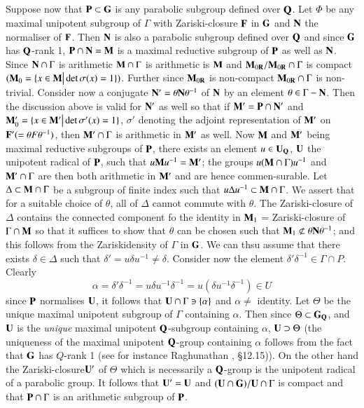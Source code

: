 \subsection{}\label{art9-subsec3.42}
Suppose now that $\mathbf{P} \subset \mathbf{G}$ is any parabolic subgroup defined over $\mathbf{Q}$. Let $\Phi$ be any maximal unipotent subgroup of $\Gamma$ with Zariski-closure $\mathbf{F}$ in $\mathbf{G}$ and $\mathbf{N}$ the normaliser of $\mathbf{F}$. Then $\mathbf{N}$ is also a parabolic subgroup defined over $\mathbf{Q}$ and since $\mathbf{G}$ has $\mathbf{Q}$-rank 1, $\mathbf{P} \cap\mathbf{N} = \mathbf{M}$ is a maximal reductive subgroup of $\mathbf{P}$ as well as $\mathbf{N}$. Since $\mathbf{N} \cap \Gamma$ is arithmetic $\mathbf{M} \cap \Gamma$ is arithmetic is $\mathbf{M}$ and $\mathbf{M}_{0\mathbf{R}}/ \mathbf{M}_{0\mathbf{R}} \cap \Gamma$ is compact $(\mathbf{M}_0 =\{x \in \mathbf{M} \big| \det \sigma (x) =1\})$. Further since $\mathbf{M}_{0\mathbf{R}}$ is non-compact $\mathbf{M}_{0\mathbf{R}} \cap \Gamma$ is non-trivial. Consider now a conjugate $\mathbf{N}' = \theta \mathbf{N} \theta^{-1}$ of $\mathbf{N}$ by an element $\theta \in \Gamma - \mathbf{N}$. Then the discussion above is valid for $\mathbf{N}'$ as well so that if $\mathbf{M}' = \mathbf{P} \cap \mathbf{N}'$ and $\mathbf{M}'_0 = \{x \in \mathbf{M}' \big| \det \sigma' (x) =1\}$, $\sigma'$ denoting the adjoint representation of $\mathbf{M}'$ on $\mathbf{F}' (= \theta F \theta^{-1})$, then $\mathbf{M}' \cap \Gamma$ is arithmetic in $\mathbf{M}'$ as well. Now $\mathbf{M}$ and $\mathbf{M}'$ being maximal reductive subgroups of $\mathbf{P}$, there exists an element $u \in \mathbf{U}_{\mathbf{Q}}$, $\mathbf{U}$ the unipotent radical of $\mathbf{P}$, such that $u \mathbf{M} u^{-1}= \mathbf{M}'$; the groups $u (\mathbf{M} \cap \Gamma) u^{-1}$ and $\mathbf{M}' \cap \Gamma$ are then both arithmetic in $\mathbf{M}'$ and are hence commen-surable. Let $\Delta \subset \mathbf{M} \cap \Gamma$ be a subgroup of finite index such that $u \Delta u^{-1} \subset \mathbf{M} \cap \Gamma$. We assert that for a suitable choice of $\theta$, all of $\Delta$ cannot commute with $\theta$. The Zariski-closure of $\Delta$ contains the connected component fo the identity in $\mathbf{M}_1$ = Zariski-closure of $\Gamma \cap \mathbf{M}$ so that it suffices to show that $\theta$ can be chosen such that $\mathbf{M}_1 \not\subset \theta \mathbf{N} \theta^{-1}$; and this follows from the Zariskidensity of $\Gamma$ in $\mathbf{G}$. We can thsu assume that there exists $\delta \in \Delta$ such that $\delta' = u \delta u^{-1} \neq \delta$. Consider now the element $\delta' \delta^{-1} \in \Gamma \cap P$. Clearly
$$
\alpha = \delta' \delta^{-1} = u \delta u^{-1} \delta^{-1} = u (\delta u^{-1} \delta^{-1}) \in U
$$
since $\mathbf{P}$ normalises $\mathbf{U}$, it follows that $\mathbf{U} \cap \Gamma \ni \{\alpha\}$ and $\alpha \neq$ identity. Let $\Theta$ be the unique maximal unipotent subgroup of $\Gamma$ containing $\alpha$. Then since $\Theta \subset \mathbf{G}_{\mathbf{Q}}$, and $\mathbf{U}$ is the \textit{unique} maximal unipotent $\mathbf{Q}$-subgroup containing $\alpha$, $\mathbf{U} \supset \Theta$ (the uniqueness of the maximal unipotent $\mathbf{Q}$-group containing $\alpha$ follows from the fact that $\mathbf{G}$ has $Q$-rank 1 (see for instance Raghunathan \cite{art9-key1}, \S 12.15)). On the other hand the Zariski-closure\pageoriginale $\mathbf{U}'$ of $\Theta$ which is necessarily a $\mathbf{Q}$-group is the unipotent radical of a parabolic group. It follows that $\mathbf{U}' = \mathbf{U}$ and $(\mathbf{U} \cap \mathbf{G})/ \mathbf{U} \cap \Gamma$ is compact and that $\mathbf{P} \cap \Gamma$ is an arithmetic subgroup of $\mathbf{P}$.

